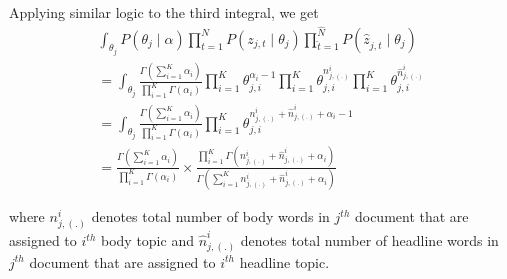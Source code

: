 \documentclass[a4paper]{article}
\begin{document}
Applying similar logic to the third integral, we get
\begin{multline}
\int_{\theta_{j}} P(\theta_{j} \mid \alpha) \prod_{t=1}^{N}P(z_{j,t} \mid \theta_{j}) \prod_{\hat{t}=1}^{\hat{N}} P(\hat{z}_{j,\hat{t}} \mid \theta_{j})\\
= \int_{\theta_{j}} \frac{\Gamma(\sum_{i=1}^{K} \alpha_{i})}{\prod_{i=1}^{K}\Gamma(\alpha_{i})} \prod_{i=1}^{K} \theta_{j,i}^{\alpha_{i} -1} \prod_{i=1}^{K} \theta_{j,i}^{n_{j,(.)}^{i}} \prod_{i=1}^{K} \theta_{j,i}^{\hat{n}_{j,(.)}^{i}} \\
= \int_{\theta_{j}} \frac{\Gamma(\sum_{i=1}^{K} \alpha_{i})}{\prod_{i=1}^{K}\Gamma(\alpha_{i})} \prod_{i=1}^{K} \theta_{j,i}^{ n_{j,(.)}^{i} + \hat{n}_{j,(.)}^{i} +  \alpha_{i} -1}\\
=  \frac{\Gamma(\sum_{i=1}^{K} \alpha_{i})}{\prod_{i=1}^{K}\Gamma(\alpha_{i})} \times \frac{\prod_{i=1}^{K} \Gamma(n_{j,(.)}^{i} + \hat{n}_{j,(.)}^{i} +  \alpha_{i} )}{\Gamma(\sum_{i=1}^{K}n_{j,(.)}^{i} + \hat{n}_{j,(.)}^{i} +  \alpha_{i} )}
\end{multline}

where $n_{j,(.)}^{i}$ denotes total number of body words in $j^{th}$ document that are assigned to $i^{th}$ body topic and $\hat{n}_{j,(.)}^{i}$ denotes total number of headline words in $j^{th}$ document that are assigned to $i^{th}$ headline topic.
\end{document}
